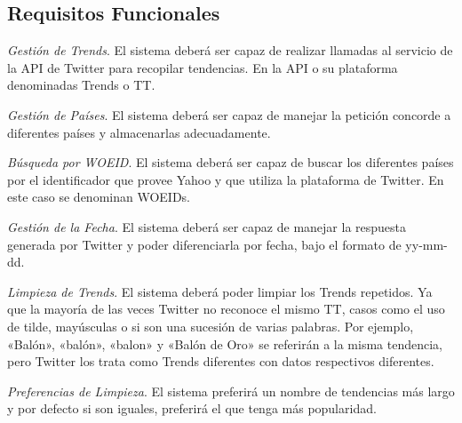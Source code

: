 \subsection{Requisitos Funcionales}

\begin{enumerate}
    { \renewcommand\labelenumi{R.F. \theenumi}
    \item
    \textit{Gestión de Trends}. El sistema deberá ser capaz de realizar llamadas al servicio de la API de Twitter para recopilar tendencias. En la API o su plataforma denominadas Trends o \ac{TT}.
        \begin{enumerate}{\renewcommand{\labelenumii}{R.F. \arabic{enumi}.\arabic{enumii}}
        \item
        \textit{Gestión de Países}. El sistema deberá ser capaz de manejar la petición concorde a diferentes países y almacenarlas adecuadamente.
            \begin{enumerate}{\renewcommand{\labelenumiii}{R.F. \arabic{enumi}.\arabic{enumii}.\arabic{enumiii}}
            \item
            \textit{Búsqueda por WOEID}. El sistema deberá ser capaz de buscar los diferentes países por el identificador que provee Yahoo y que utiliza la plataforma de Twitter. En este caso se denominan WOEIDs.
            }\end{enumerate}
        \item
        \textit{Gestión de la Fecha}. El sistema deberá ser capaz de manejar la respuesta generada por Twitter y poder diferenciarla por fecha, bajo el formato de yy-mm-dd.
        \item
        \textit{Limpieza de Trends}. El sistema deberá poder limpiar los Trends repetidos. Ya que la mayoría de las veces Twitter no reconoce el mismo \ac{TT}, casos como el uso de tilde, mayúsculas o si son una sucesión de varias palabras. Por ejemplo, «Balón», «balón», «balon» y «Balón de Oro» se referirán a la misma tendencia, pero Twitter los trata como Trends diferentes con datos respectivos diferentes.
        \begin{enumerate}{\renewcommand{\labelenumiii}{R.F. \arabic{enumi}.\arabic{enumii}.\arabic{enumiii}}
            \item
            \textit{Preferencias de Limpieza}. El sistema preferirá un nombre de tendencias más largo y por defecto si son iguales, preferirá el que tenga más popularidad.
            }\end{enumerate}
        \item
}
\end{enumerate}}
\end{enumerate}
